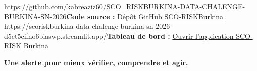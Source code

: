 \documentclass[12pt,a4paper]{article}
\newcommand{\GitHubURL}{https://github.com/kabreaziz60/SCO_RISKBURKINA-DATA-CHALENGE-BURKINA-SN-2026}
\newcommand{\DashboardURL}{https://scoriskburkina-data-chalenge-burkina-sn-2026-d5et5cifno6biaswp.streamlit.app/}
\begin{document}
\ifx\GitHubURL\empty\else\textbf{Code source :} \href{\GitHubURL}{Dépôt GitHub SCO-RISKBurkina}\\\fi
\ifx\DashboardURL\empty\else\textbf{Tableau de bord :} \href{\DashboardURL}{Ouvrir l'application SCO-RISK Burkina}\fi

\vfill
\begin{center}
{\large\bfseries\color{Blue}Une alerte pour mieux vérifier, comprendre et agir.}
\end{center}
\end{document}
